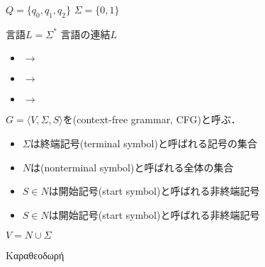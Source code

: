 \documentclass[../main.tex]{subfiles}
\begin{document}
\(Q = \{q_0, q_1, q_2\}\)
\(\Sigma = \{0, 1\}\)

\begin{definition}
言語\(L = \Sigma^{\mathord{*}}\)
言語の連結\(L\)
\end{definition}

\begin{itemize}
    \item {} \(\to\)  
    \item {} \(\to\) 
    \item {} \(\to\) 
\end{itemize}

\begin{figure}
    \centering
\end{figure}

\begin{definition} \(G = \langle V, \Sigma, S \rangle\)を(context-free grammar, CFG)と呼ぶ．
\begin{itemize}
    \item \(\Sigma\)は終端記号(terminal symbol)と呼ばれる記号の集合
    \item \(N\)は(nonterminal symbol)と呼ばれる全体の集合
    \item \(S \in N\)は開始記号(start symbol)と呼ばれる非終端記号
    \item \(S \in N\)は開始記号(start symbol)と呼ばれる非終端記号
\end{itemize}

\(V = N \cup \Sigma\)

\end{definition}

\textgreek{Καραθεοδωρή}
\end{document}
